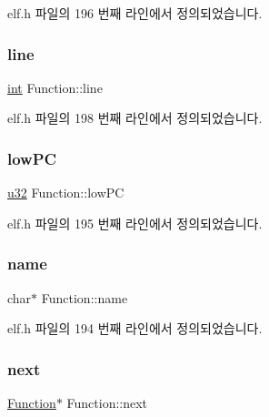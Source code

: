 elf.\+h 파일의 196 번째 라인에서 정의되었습니다.

\mbox{\label{struct_function_a5b0b91c925b133e7eb1f0cae96f7aecc}} 
\subsubsection{\texorpdfstring{line}{line}}
{\footnotesize\ttfamily \mbox{\hyperlink{_util_8cpp_a0ef32aa8672df19503a49fab2d0c8071}{int}} Function\+::line}



elf.\+h 파일의 198 번째 라인에서 정의되었습니다.

\mbox{\label{struct_function_acfcfc3e0b585bafa5690e3edf8936d87}} 
\subsubsection{\texorpdfstring{low\+PC}{lowPC}}
{\footnotesize\ttfamily \mbox{\hyperlink{_system_8h_a10e94b422ef0c20dcdec20d31a1f5049}{u32}} Function\+::low\+PC}



elf.\+h 파일의 195 번째 라인에서 정의되었습니다.

\mbox{\label{struct_function_afc3b67aebc6b6c91044c6b09d7279eb0}} 
\subsubsection{\texorpdfstring{name}{name}}
{\footnotesize\ttfamily char$\ast$ Function\+::name}



elf.\+h 파일의 194 번째 라인에서 정의되었습니다.

\mbox{\label{struct_function_a20ace60d6eba6736e143166b0137b87f}} 
\subsubsection{\texorpdfstring{next}{next}}
{\footnotesize\ttfamily \mbox{\hyperlink{struct_function}{Function}}$\ast$ Function\+::next}



